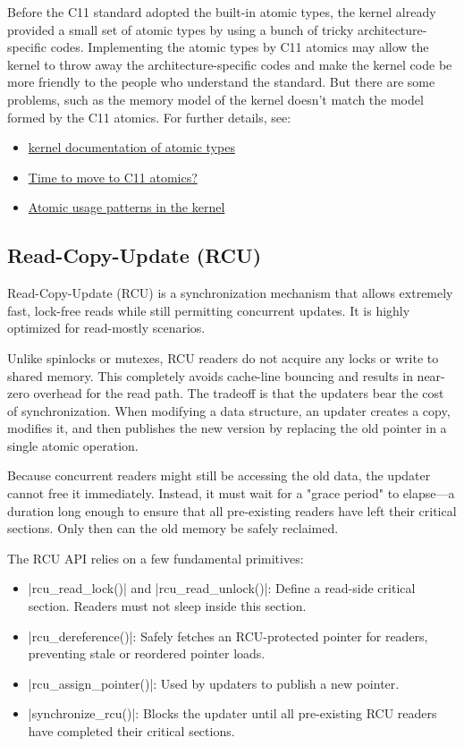\documentclass[10pt, oneside]{book}
\begin{document}

Before the C11 standard adopted the built-in atomic types, the kernel already provided a small set of atomic types by using a bunch of tricky architecture-specific codes.
Implementing the atomic types by C11 atomics may allow the kernel to throw away the architecture-specific codes and make the kernel code be more friendly to the people who understand the standard.
But there are some problems, such as the memory model of the kernel doesn't match the model formed by the C11 atomics.
For further details, see:
\begin{itemize}
  \item \href{https://www.kernel.org/doc/Documentation/atomic_t.txt}{kernel documentation of atomic types}
  \item \href{https://lwn.net/Articles/691128/}{Time to move to C11 atomics?}
  \item \href{https://lwn.net/Articles/698315/}{Atomic usage patterns in the kernel}
\end{itemize}

\subsection{Read-Copy-Update (RCU)}
\label{sec:rcu}
Read-Copy-Update (RCU) is a synchronization mechanism that allows extremely fast, lock-free reads while still permitting concurrent updates.
It is highly optimized for read-mostly scenarios.

Unlike spinlocks or mutexes, RCU readers do not acquire any locks or write to shared memory.
This completely avoids cache-line bouncing and results in near-zero overhead for the read path.
The tradeoff is that the updaters bear the cost of synchronization.
When modifying a data structure, an updater creates a copy, modifies it, and then publishes the new version by replacing the old pointer in a single atomic operation.

Because concurrent readers might still be accessing the old data, the updater cannot free it immediately.
Instead, it must wait for a "grace period" to elapse---a duration long enough to ensure that all pre-existing readers have left their critical sections.
Only then can the old memory be safely reclaimed.

The RCU API relies on a few fundamental primitives:
\begin{itemize}
  \item \cpp|rcu_read_lock()| and \cpp|rcu_read_unlock()|: Define a read-side critical section. Readers must not sleep inside this section.
  \item \cpp|rcu_dereference()|: Safely fetches an RCU-protected pointer for readers, preventing stale or reordered pointer loads.
  \item \cpp|rcu_assign_pointer()|: Used by updaters to publish a new pointer.
  \item \cpp|synchronize_rcu()|: Blocks the updater until all pre-existing RCU readers have completed their critical sections.
\end{itemize}
\end{document}
